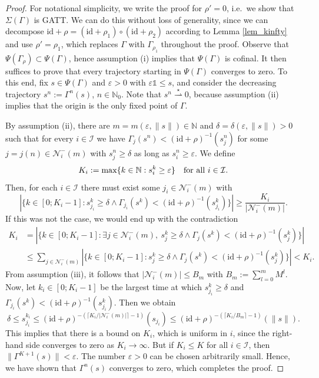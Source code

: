 \documentclass[10pt, oneside, a4paper]{article}
\newcommand{\N}{\mathbb{N}}
\newcommand{\ep}{\varepsilon}
\newcommand{\unit}{\mathds{1}}
\newcommand{\id}{\mathrm{id}}
\newcommand{\IC}{\mathcal{I}}
\newcommand{\NC}{\mathcal{N}}
\begin{document}
\begin{proof}
For notational simplicity, we write the proof for $\rho' = 0$, i.e.~we show that $\Sigma(\Gamma)$ is GATT. We can do this without loss of generality, since we can decompose $\id + \rho = (\id + \rho_1) \circ (\id + \rho_2)$ according to Lemma \ref{lem_kinfty} and use $\rho' = \rho_1$, which replaces $\Gamma$ with $\Gamma_{\rho_1}$ throughout the proof. Observe that $\Psi(\Gamma_{\rho}) \subset \Psi(\Gamma)$, hence assumption (i) implies that $\Psi(\Gamma)$ is cofinal. It then suffices to prove that every trajectory starting in $\Psi(\Gamma)$ converges to zero. To this end, fix $s \in \Psi(\Gamma)$ and $\ep > 0$ with $\ep\unit \leq s$, and consider the decreasing trajectory $s^n := \Gamma^n(s)$, $n \in \N_0$. Note that $s^n \stackrel{\star}{\rightharpoonup} 0$, because assumption (ii) implies that the origin is the only fixed point of $\Gamma$.%

By assumption (ii), there are $m = m(\ep,\|s\|) \in \N$ and $\delta = \delta(\ep,\|s\|) > 0$ such that for every $i \in \IC$ we have $\Gamma_j(s^n) < (\id + \rho)^{-1}(s^n_j)$ for some $j = j(n) \in \NC^-_i(m)$ with $s_j^n \geq \delta$ as long as $s^n_i \geq \ep$. We define%
\begin{equation*}
  K_i := \max\{ k \in \N : s^k_i \geq \ep \} \mbox{\quad for all\ } i \in \IC.%
\end{equation*}
Then, for each $i \in \IC$ there must exist some $j_i \in \NC^-_i(m)$ with%
\begin{equation*}
  |\{ k \in [0;K_i-1] : s^k_{j_i} \geq \delta \wedge \Gamma_{j_i}(s^k) < (\id + \rho)^{-1}(s^k_{j_i}) \}| \geq \frac{K_i}{|\NC^-_i(m)|}.%
\end{equation*}
If this was not the case, we would end up with the contradiction%
\begin{align*}
  K_i &= |\{ k \in [0;K_i-1] : \exists j \in \NC^-_i(m),\	s^k_j \geq \delta \wedge \Gamma_j(s^k) < (\id + \rho)^{-1}(s^k_j) \}| \\
	    &\leq \sum_{j \in \NC^-_i(m)} |\{ k \in [0;K_i-1] : s^k_j \geq \delta \wedge \Gamma_j(s^k) < (\id + \rho)^{-1}(s^k_j) \}| < K_i.%
\end{align*}
From assumption (iii), it follows that $|\NC^-_i(m)| \leq B_m$ with $B_m := \sum_{l=0}^m M^l$. Now, let $k_i \in [0;K_i - 1]$ be the largest time at which $s^k_{j_i} \geq \delta$ and $\Gamma_{j_i}(s^k) < (\id + \rho)^{-1}(s^k_{j_i})$. Then we obtain%
\begin{equation*}
  \delta \leq s^{k_i}_{j_i} \leq (\id + \rho)^{-(\lceil K_i/|\NC^-_i(m)| \rceil - 1)}(s_{j_i}) \leq (\id + \rho)^{-(\lceil K_i/B_m \rceil - 1)}(\|s\|).%
\end{equation*}
This implies that there is a bound on $K_i$, which is uniform in $i$, since the right-hand side converges to zero as $K_i \rightarrow \infty$. But if $K_i \leq K$ for all $i \in \IC$, then $\|\Gamma^{K+1}(s)\| < \ep$. The number $\ep > 0$ can be chosen arbitrarily small. Hence, we have shown that $\Gamma^n(s)$ converges to zero, which completes the proof.
\end{proof}
\end{document}
